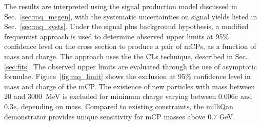 {\begin{table}[t]
\caption{Predictions and observations in the 5 orthogonal signal regions.
Uncertainties shown in the predictions include both statistical uncertainty
from the limited size of the control regions, and systematic uncertainty from small disagreements
in the beam-off validation.
The observed event counts are consistent with the predicted counts in all cases.
The final three columns give estimated signal yields for three benchmark $(m_\mrm{mCP},Q)$ points
near the exclusion boundary.
\label{tab:mq_results}}
\centering
\renewcommand{\arraystretch}{1.3}
\end{table}


}

The results are interpreted using the signal production model discussed in Sec.~\ref{sec:mq_mcgen}, with the systematic uncertainties on signal yields listed in
Sec.~\ref{sec:mq_systs}.
Under the signal plus background hypothesis, a modified frequentist approach is used
to determine observed upper limits at 95\% confidence level
on the cross section to produce a pair of mCPs, as a function of mass and charge. 
The approach uses the the CLs
technique, described in Sec. \ref{sec:fits}. The observed upper limits are evaluated
through the use of asymptotic formulae. Figure~\ref{fig:mq_limit} shows the exclusion at 95\% 
confidence level in mass and charge of the mCP. 
The existence of new particles with mass between 20 and 3000~MeV is excluded for minimum charge varying
 between $0.006e$ and $0.3e$, depending on mass.
Compared to existing constraints, 
the milliQan demonstrator provides unique sensitivity for mCP masses above 0.7 GeV.

